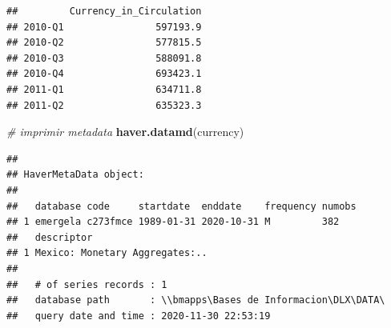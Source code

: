 \documentclass[
]{book}
\newenvironment{Shaded}{\begin{snugshade}}{\end{snugshade}}
\newcommand{\CommentTok}[1]{\textcolor[rgb]{0.56,0.35,0.01}{\textit{#1}}}
\newcommand{\DataTypeTok}[1]{\textcolor[rgb]{0.13,0.29,0.53}{#1}}
\newcommand{\KeywordTok}[1]{\textcolor[rgb]{0.13,0.29,0.53}{\textbf{#1}}}
\newcommand{\NormalTok}[1]{#1}
\newcommand{\OperatorTok}[1]{\textcolor[rgb]{0.81,0.36,0.00}{\textbf{#1}}}
\newcommand{\StringTok}[1]{\textcolor[rgb]{0.31,0.60,0.02}{#1}}
\begin{document}
\begin{Shaded}
\end{Shaded}

\begin{verbatim}
##         Currency_in_Circulation
## 2010-Q1                597193.9
## 2010-Q2                577815.5
## 2010-Q3                588091.8
## 2010-Q4                693423.1
## 2011-Q1                634711.8
## 2011-Q2                635323.3
\end{verbatim}

\begin{Shaded}
\begin{Highlighting}[]
\CommentTok{# imprimir metadata}
\KeywordTok{haver.datamd}\NormalTok{(currency)}
\end{Highlighting}
\end{Shaded}

\begin{verbatim}
## 
## HaverMetaData object:
## 
##   database code     startdate  enddate    frequency numobs
## 1 emergela c273fmce 1989-01-31 2020-10-31 M         382   
##   descriptor                    
## 1 Mexico: Monetary Aggregates:..
## 
##   # of series records : 1
##   database path       : \\bmapps\Bases de Informacion\DLX\DATA\
##   query date and time : 2020-11-30 22:53:19
\end{verbatim}
\end{document}
